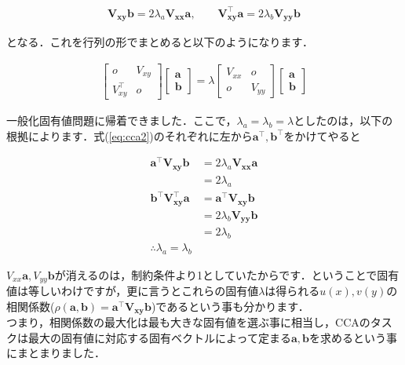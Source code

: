 \documentclass[11pt,a4paper,uplatex]{ujreport}
\begin{document}
\begin{align}
  \label{eq:cca2}
  \bm{V_{xy} b} = 2\lambda_a \bm{V_{xx}a}, \qquad \bm{V_{xy}^\top a}=2\lambda_b \bm{V_{yy}b}
\end{align}

となる．これを行列の形でまとめると以下のようになります．

\begin{align}
  \begin{bmatrix}
    o & V_{xy}\\
    V_{xy}^\top & o
  \end{bmatrix}
  \begin{bmatrix}
    \bm{a}\\
    \bm{b}
  \end{bmatrix}=\lambda
  \begin{bmatrix}
    V_{xx} & o\\
    o & V_{yy}
  \end{bmatrix}
  \begin{bmatrix}
    \bm{a}\\
    \bm{b}
  \end{bmatrix}
\end{align}

一般化固有値問題に帰着できました．ここで，$\lambda_a = \lambda_b = \lambda$としたのは，以下の根拠によります．式(\ref{eq:cca2})のそれぞれに左から$\bm{a^\top, b^\top}$をかけてやると

\begin{align}
  \bm{a^\top V_{xy}b} &= 2\lambda_a \bm{V_{xx}a}\\
  &= 2\lambda_a\\
  \bm{b^\top V_{xy}^\top a} &= \bm{a^\top V_{xy}b}\\
  &=2\lambda_b \bm{V_{yy}b}\\
  &=2\lambda_b\\
  \therefore \lambda_a = \lambda_b
\end{align}

$V_{xx}\bm{a}, V_{yy}\bm{b}$が消えるのは，制約条件より1としていたからです．ということで固有値は等しいわけですが，更に言うとこれらの固有値$\lambda$は得られる$u(x),v(y)$の相関係数($\rho(\bm{a,b}) = \bm{a^\top V_{xy}b}$)であるという事も分かります．\\

つまり，相関係数の最大化は最も大きな固有値を選ぶ事に相当し，CCAのタスクは最大の固有値に対応する固有ベクトルによって定まる$\bm{a,b}$を求めるという事にまとまりました．\\\\
\end{document}
